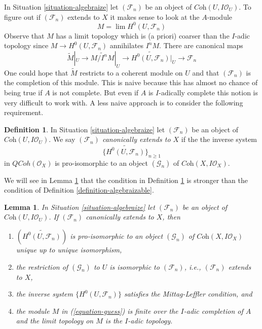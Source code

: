 \documentclass[10pt,a4paper]{amsart}
\theoremstyle{plain}
\newtheorem{lemma}[subsection]{Lemma}
\theoremstyle{definition}
\newtheorem{definition}[subsection]{Definition}
\theoremstyle{remark}
\numberwithin{equation}{subsection}
\def\lim{\mathop{\mathrm{lim}}\nolimits}
\def\QCoh{\mathit{QCoh}}
\begin{document}
\noindent
In Situation \ref{situation-algebraize} let $(\mathcal{F}_n)$ be an
object of $\textit{Coh}(U, I\mathcal{O}_U)$. To figure out if
$(\mathcal{F}_n)$ extends to $X$ it makes sense to look at the $A$-module
\begin{equation}
\label{equation-guess}
M = \lim H^0(U, \mathcal{F}_n)
\end{equation}
Observe that $M$ has a limit topology which is (a priori) coarser than
the $I$-adic topology since $M \to H^0(U, \mathcal{F}_n)$ annihilates $I^nM$.
There are canonical maps
$$
\widetilde{M}|_U \to \widetilde{M/I^nM}|_U \to
\widetilde{H^0(U, \mathcal{F}_n)}|_U \to
\mathcal{F}_n
$$
One could hope that $\widetilde{M}$ restricts to a coherent module
on $U$ and that $(\mathcal{F}_n)$ is the completion of this module.
This is naive because this has almost no chance of being true
if $A$ is not complete. But even if $A$ is $I$-adically complete
this notion is very difficult to work with.
A less naive approach is to consider the following requirement.

\begin{definition}
\label{definition-canonically-algebraizable}
In Situation \ref{situation-algebraize} let $(\mathcal{F}_n)$ be an
object of $\textit{Coh}(U, I\mathcal{O}_U)$. We say
{\it $(\mathcal{F}_n)$ canonically extends to $X$} if the the
inverse system
$$
\{\widetilde{H^0(U, \mathcal{F}_n)}\}_{n \geq 1}
$$
in $\QCoh(\mathcal{O}_X)$ is pro-isomorphic to an object
$(\mathcal{G}_n)$ of $\textit{Coh}(X, I\mathcal{O}_X)$.
\end{definition}

\noindent
We will see in Lemma \ref{lemma-canonically-algebraizable}
that the condition in Definition \ref{definition-canonically-algebraizable}
is stronger than the condition of Definition \ref{definition-algebraizable}.

\begin{lemma}
\label{lemma-canonically-algebraizable}
In Situation \ref{situation-algebraize} let $(\mathcal{F}_n)$ be an
object of $\textit{Coh}(U, I\mathcal{O}_U)$. If $(\mathcal{F}_n)$
canonically extends to $X$, then
\begin{enumerate}
\item $(\widetilde{H^0(U, \mathcal{F}_n)})$ is pro-isomorphic to an
object $(\mathcal{G}_n)$ of $\textit{Coh}(X, I \mathcal{O}_X)$
unique up to unique isomorphism,
\item the restriction of $(\mathcal{G}_n)$ to $U$ is isomorphic
to $(\mathcal{F}_n)$, i.e., $(\mathcal{F}_n)$ extends to $X$,
\item the inverse system $\{H^0(U, \mathcal{F}_n)\}$
satisfies the Mittag-Leffler condition, and
\item the module $M$ in (\ref{equation-guess}) is finite over the
$I$-adic completion of $A$ and the limit topology on
$M$ is the $I$-adic topology.
\end{enumerate}
\end{lemma}
\end{document}
